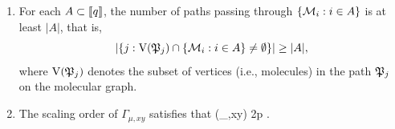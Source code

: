\begin{lemma}
\begin{enumerate}
    \item[(5)] For each $A\subset \llbracket{q}\rrbracket$, the number of paths passing through 
        $\{\mathcal{M}_i: i\in A\}$ is at least $|A|$, that is,
        $$
     \left|\left\{j: \mathrm V(\mathfrak{P}_j) \cap  \{\mathcal{M}_i: i\in A\}\ne \emptyset\right\}\right|\ge |A| ,$$
     where $\mathrm V(\mathfrak{P}_j)$ denotes the subset of vertices (i.e., molecules) in the path $\mathfrak{P}_j$ on the molecular graph.

     \item[(6)] The scaling order of $\Gamma_{\mu,xy}$ satisfies that
     \be\label{eq:sizeGammamu}
\ord(\Gamma_{\mu,xy}) \ge 2p .  %
     \ee
\end{enumerate}

\end{lemma}




